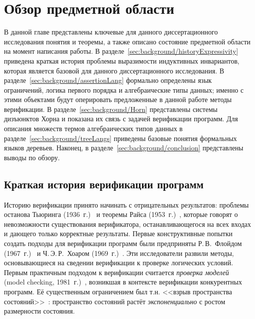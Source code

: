\chapter{Обзор предметной области}\label{ch:background}

В данной главе представлены ключевые для данного диссертационного исследования понятия и теоремы, а также описано состояние предметной области на момент написания работы.
В разделе~\cref{sec:background/historyExpressivity} приведена краткая история проблемы выразимости индуктивных инвариантов, которая является базовой для данного диссертационного исследования.
В разделе~\cref{sec:background/assertionLang} формально определены язык ограничений, логика первого порядка и алгебраические типы данных; именно с этими объектами будут оперировать предложенные в данной работе методы верификации.
В разделе~\cref{sec:background/Horn} представлены системы дизъюнктов Хорна и показана их связь с задачей верификации программ.
Для описания множеств термов алгебраических типов данных в разделе~\cref{sec:background/treeLangs} приведены базовые понятия формальных языков деревьев.
Наконец, в разделе~\cref{sec:background/conclusion} представлены выводы по обзору.


\section{Краткая история верификации программ}\label{sec:background/historyVerification}

Историю верификации принято начинать с отрицательных результатов: проблемы останова Тьюринга (1936~г.)~\cite{turing1936computable} и теоремы Райса (1953~г.)~\cite{10.2307/1990888}, которые говорят о невозможности существования верификатора, останавливающегося на всех входах и дающего только корректные результаты.
Первые конструктивные попытки создать подходы для верификации программ были предприняты Р.\,В.~Флойдом (1967~г.)~\cite{Floyd1993} и Ч.\,Э.\,Р.~Хоаром (1969~г.)~\cite{10.1145/363235.363259}. Эти исследователи развили методы, основывающиеся на сведении верификации к проверке логических условий.
Первым практичным подходом к верификации считается \emph{проверка моделей} (model checking, 1981~г.)~\cite{10.1007/BFb0025774}, возникшая в контексте верификации конкурентных программ.
Её существенным ограничением был т.\:н. <<взрыв пространства состояний>>~\cite{10.1007/978-3-540-69850-0_1}: пространство состояний растёт \emph{экспоненциально} с ростом размерности состояния.

